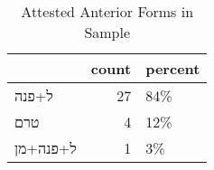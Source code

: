 \begin{table}[htbp!]
\centering
\caption{Attested Anterior Forms in Sample}
\label{table:ant_front}
\begin{tabular}{lrl}
\toprule
{} &  count & percent \\
\midrule
\texthebrew{ל+פנה}    &     27 &     84\% \\
\texthebrew{טרם}      &      4 &     12\% \\
\texthebrew{ל+פנה+מן} &      1 &      3\% \\
\bottomrule
\end{tabular}
\end{table}
